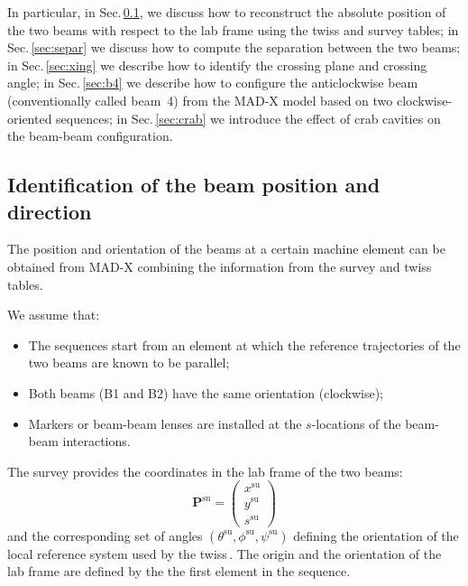 In particular, in Sec.\,\ref{sec:posdir}, we discuss how to reconstruct the absolute position of the two beams with respect to the lab frame using the twiss and survey tables; in Sec.\,\ref{sec:separ} we discuss how to compute the separation between the two beams; in Sec.\,\ref{sec:xing} we describe how to identify the crossing plane and crossing angle; in Sec.\,\ref{sec:b4} we describe how to configure the anticlockwise beam (conventionally called beam~4)  from the MAD-X model based on two clockwise-oriented sequences; in Sec.\,\ref{sec:crab} we introduce the effect of crab cavities on the beam-beam configuration. 

\subsection{Identification of the beam position and direction}
\label{sec:posdir}

The position and orientation of the beams at a certain machine element can be obtained from MAD-X combining the information from the survey and twiss tables.

We assume that:
\begin{itemize}
    \item The sequences start from an element at which the reference trajectories of the two beams are known to be parallel;
    \item Both beams (B1 and B2) have the same orientation (clockwise);
    \item Markers or beam-beam lenses are installed at the $s$-locations of the beam-beam interactions.
\end{itemize}

The survey provides the coordinates in the lab frame of the two beams:
\begin{equation}
    \textbf{P}^\text{su} = \left(
    \begin{array}{c}
         x^\text{su}\\
         y^\text{su}\\
         s^\text{su}
    \end{array}\right)
\end{equation}
and the corresponding set of angles $(\theta^\text{su}, \phi^\text{su}, \psi^\text{su})$ defining the orientation of the local reference system used by the twiss\,\cite{madsite}. The origin and the orientation of the lab frame are defined by the the first element in the sequence.


